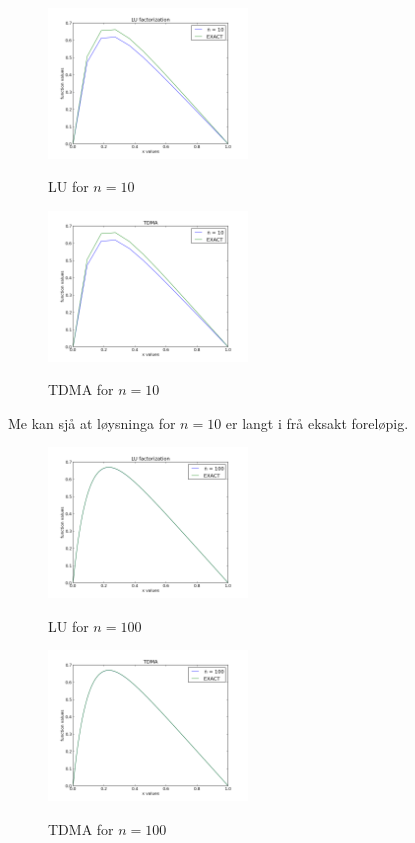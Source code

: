 \documentclass[11pt, a4paper]{article}
\begin{document}
    \begin{figure}[H]
      \centering
      \includegraphics[width=200px]{LU10.png} \\
      \caption{LU for $n = 10$}
    \end{figure}
    \begin{figure}
      \centering
      \includegraphics[width=200px]{TDMA10.png} \\
      \caption{TDMA for $n = 10$}
    \end{figure}

    Me kan sjå at løysninga for $n = 10$ er langt i frå eksakt foreløpig.

    \begin{figure}
      \centering
      \includegraphics[width=200px]{LU100.png} \\
      \caption{LU for $n = 100$}
    \end{figure}
    \begin{figure}
      \centering
      \includegraphics[width=200px]{TDMA100.png} \\
      \caption{TDMA for $n = 100$}
    \end{figure}
\end{document}
